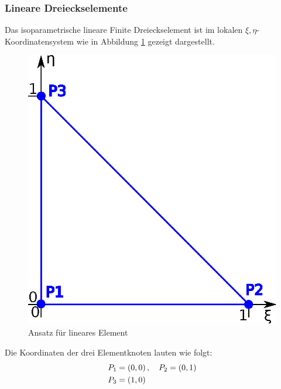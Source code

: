 \subsubsection{Lineare Dreieckselemente}
\label{sec:linear_triangles}
Das isoparametrische lineare Finite Dreieckselement ist im lokalen $\xi,\eta$-Koordinatensystem wie in Abbildung \ref{fig:linear_element} gezeigt dargestellt. \newline

\begin{figure}
	\begin{center}
		\includegraphics[scale=0.65]{pics/linear_element.eps}
	\end{center}
	\caption{Ansatz für lineares Element}
	\label{fig:linear_element}
\end{figure}

Die Koordinaten der drei Elementknoten lauten wie folgt:
\begin{align}
&P_1 = \left(0, 0 \right), \quad P_2 = \left(0, 1 \right) \\
&P_3 = \left(1, 0 \right) \nonumber
\end{align}

